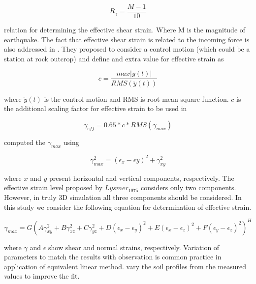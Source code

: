 \begin{equation}
R_{\gamma} = \frac{M-1}{10}
\end{equation}

 relation for determining the effective shear strain. Where M is the magnitude of earthquake. The fact that effective shear strain is related to the incoming force is also addressed in \citet{Lysmer1975}. They proposed to consider a control motion (which could be a station at rock outcrop) and define and extra value for effective strain as 
 
 \begin{equation}
c = \frac{max|\ddot{y}(t)|}{RMS(\ddot{y}(t))}
\end{equation}

where $\ddot{y}(t)$ is the control motion and RMS is root mean square function. $c$ is the additional scaling factor for effective strain to be used in 

\begin{equation}
\gamma_{eff}=0.65*c*RMS(\gamma_{max})
\end{equation}

 \citet{Lysmer_1975} computed the $\gamma_{max}$ using
 
 \begin{equation}
 \gamma_{max}^{2} = (\epsilon_{x}-\epsilon{y})^2 + \gamma_{xy}^{2}
 \end{equation}
 
where $x$ and $y$ present horizontal and vertical components, respectively.  The effective strain level proposed by $Lysmer_1975$ considers only two components. However, in truly 3D simulation all three components should be considered. In this study we consider the following equation for determination of effective strain.

 \begin{equation}
 \gamma_{max} = G(A \gamma_{xy}^{2} + B\gamma_{xz}^{2} + C\gamma_{yz}^{2} + D(\epsilon_{x}-\epsilon_{y})^2 +E(\epsilon_{x}-\epsilon_{z})^2+F(\epsilon_{y}-\epsilon_{z})^2)^H
 \end{equation}
 
 where $\gamma$ and $\epsilon$ show shear and normal strains, respectively. Variation of parameters to match the results with observation is common practice in application of equivalent linear method.  \citet{Assimaki2006attenuation} vary the soil profiles from the measured values to improve the fit. 

 
